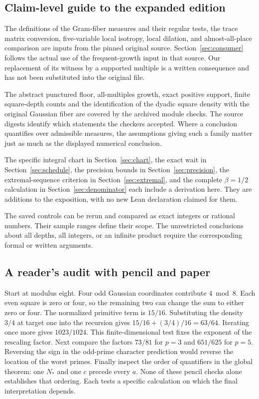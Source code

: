 \documentclass[12pt,letterpaper]{article}
\begin{document}
\subsection{Claim-level guide to the expanded edition}
\begin{description}[style=nextline,leftmargin=1.35em,labelwidth=1em]
\item[Original source.] The definitions of the Gram-fiber measures and their regular tests, the trace matrix conversion, five-variable local isotropy, local dilation, and almost-all-place comparison are inputs from the pinned original source. Section~\ref{sec:consumer} follows the actual use of the frequent-growth input in that source. Our replacement of its witness by a supported multiple is a written consequence and has not been substituted into the original file.
\item[Checked in the research release.] The abstract punctured floor, all-multiples growth, exact positive support, finite square-depth counts and the identification of the dyadic square density with the original Gaussian fiber are covered by the archived module checks. The source digests identify which statements the checkers accepted. Where a conclusion quantifies over admissible measures, the assumptions giving such a family matter just as much as the displayed numerical conclusion.
\item[Written consequences.] The specific integral chart in Section~\ref{sec:chart}, the exact wait in Section~\ref{sec:schedule}, the precision bounds in Section~\ref{sec:precision}, the extremal-sequence criterion in Section~\ref{sec:extremal}, and the complete $\beta=1/2$ calculation in Section~\ref{sec:denominator} each include a derivation here. They are additions to the exposition, with no new Lean declaration claimed for them.
\item[Finite evidence.] The saved controls can be rerun and compared as exact integers or rational numbers. Their sample ranges define their scope. The unrestricted conclusions about all depths, all integers, or an infinite product require the corresponding formal or written arguments.
\end{description}

\subsection{A reader's audit with pencil and paper}
Start at modulus eight. Four odd Gaussian coordinates contribute $4\bmod8$. Each even square is zero or four, so the remaining two can change the sum to either zero or four. The normalized primitive term is $15/16$. Substituting the density $3/4$ at target one into the recursion gives $15/16+(3/4)/16=63/64$. Iterating once more gives $1023/1024$. This finite-dimensional test fixes the exponent of the rescaling factor. Next compare the factors $73/81$ for $p=3$ and $651/625$ for $p=5$. Reversing the sign in the odd-prime character prediction would reverse the location of the worst primes. Finally inspect the order of quantifiers in the global theorem: one $N_*$ and one $c$ precede every $a$. None of these pencil checks alone establishes that ordering. Each tests a specific calculation on which the final interpretation depends.
\end{document}
